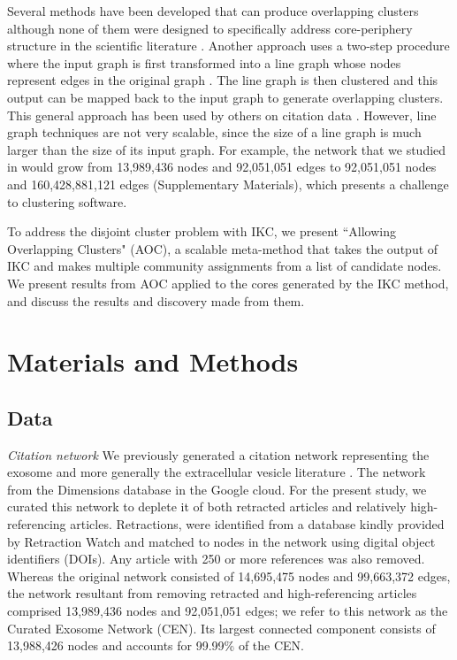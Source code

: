 \documentclass[12pt, oneside]{article}   	%
\begin{document}
Several methods have been developed that can produce overlapping clusters although none of them were designed to specifically address core-periphery structure in the scientific literature  \citep{Baumes2005,Palla2005,banerjee2005model,Cleuziou2008,Lancichinetti2009,Lu2012}. Another approach uses a two-step procedure where the input graph is first transformed into a line graph whose nodes represent edges in the original graph \citep{Harary1960}.  The line graph is then clustered and this output can be mapped back to the input graph to generate overlapping clusters. This general approach has been used by others on citation data \citep{Evans2009,Havemann2021}. However, line graph  techniques are not very scalable, since the size of a line graph is much larger than the size of its input graph. For example, the network that we studied in \cite{Wedell2022} would grow from 13,989,436 nodes and 92,051,051 edges to 92,051,051 nodes and 160,428,881,121 edges (Supplementary Materials), which presents a challenge to clustering software.
 
To address the disjoint cluster problem with IKC, we present ``Allowing Overlapping Clusters" (AOC), a scalable meta-method that takes the output of IKC and makes multiple community assignments from a list of candidate nodes. We present results from AOC applied to the cores generated by the IKC method, and discuss the results and discovery made from them.
 
\section{Materials and Methods}

\subsection{Data} 

\emph{Citation network} We previously generated a citation network \citep{Wedell2022} representing the exosome \citep{harding1983} and more generally the extracellular vesicle literature \citep{raposo2021}. The network from the Dimensions database \citep{hook2018dimensions} in the Google cloud. For the present study, we curated this network to deplete it of both retracted articles and relatively high-referencing articles. Retractions, were identified from a database kindly provided by Retraction Watch and matched to nodes in the network using digital object identifiers (DOIs). Any article with 250 or more references was also removed. Whereas the original network consisted of 14,695,475 nodes and 99,663,372 edges, the network resultant from removing retracted and high-referencing articles comprised 13,989,436 nodes and 92,051,051 edges; we refer to this network as   the Curated Exosome Network (CEN). Its largest connected component consists of 13,988,426 nodes and accounts for 99.99\% of the CEN.
\end{document}
